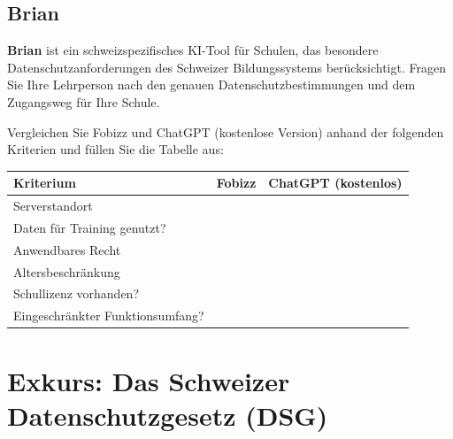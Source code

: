\subsection{Brian}

\begin{myexample}
\textbf{Brian} ist ein schweizspezifisches KI-Tool für Schulen, das besondere
Datenschutzanforderungen des Schweizer Bildungssystems berücksichtigt.
Fragen Sie Ihre Lehrperson nach den genauen Datenschutzbestimmungen
und dem Zugangsweg für Ihre Schule.
\end{myexample}

\begin{myexercise}
Vergleichen Sie Fobizz und ChatGPT (kostenlose Version) anhand der
folgenden Kriterien und füllen Sie die Tabelle aus:

\begin{center}
\begin{tabular}{p{4cm}p{4.5cm}p{4.5cm}}
    \toprule
    \textbf{Kriterium}             & \textbf{Fobizz}  & \textbf{ChatGPT (kostenlos)} \\
    \midrule
    Serverstandort                 &                  &                              \\[0.5cm]
    Daten für Training genutzt?    &                  &                              \\[0.5cm]
    Anwendbares Recht              &                  &                              \\[0.5cm]
    Altersbeschränkung             &                  &                              \\[0.5cm]
    Schullizenz vorhanden?         &                  &                              \\[0.5cm]
    Eingeschränkter Funktionsumfang?&                 &                              \\[0.5cm]
    \bottomrule
\end{tabular}
\end{center}
\end{myexercise}

\section{Exkurs: Das Schweizer Datenschutzgesetz (DSG)}

